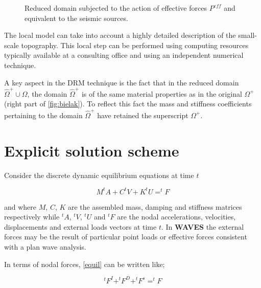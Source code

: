 \documentclass[12pt,letterpaper]{article}
\begin{document}
\begin{itemize}
\begin{figure}[H]
\centering
{}
\caption{Reduced domain subjected to the action of effective forces $P^{eff}$ and equivalent to the seismic sources.}
\label{fig:SII}
\end{figure}


The local model can take into account a highly detailed description of the small-scale topography. This local step can be performed using computing resources typically available at a consulting office and using an independent numerical technique.

\end{itemize}


A key aspect in the DRM technique is the fact that in the reduced domain $\hat{\Omega}^+ \cup \Omega$, the domain $\hat{\Omega}^+$ is of the same material properties as in the original $\Omega^+$ (right part of \cref{fig:bielak}). To reflect this fact the mass and stiffness coefficients pertaining to the domain $\hat{\Omega}^+$ have retained the superscript $\Omega^+$. 



\section{Explicit solution scheme}
Consider the discrete dynamic equilibrium equations at time $t$

\begin{equation}
M^{t}A+C^{t}V+K^{t}U=^{t}F
\label{equil}
\end{equation}

and where $M$, $C$, $K$ are the assembled mass, damping and stiffness matrices respectively while $^{t}A$, $^{t}V$, $^{t}U$ and  $^{t}F$ are the nodal accelerations, velocities, displacements and external loads vectors at time $t$. In {\bf WAVES} the external forces may be the result of particular point loads or effective forces consistent with a plan wave analysis.

In terms of nodal forces, \cref{equil} can be written like;

\begin{equation}
^{t}F^I+^{t}F^D+^{t}F^s=^{t}F
\label{force equil}
\end{equation}
\end{document}
